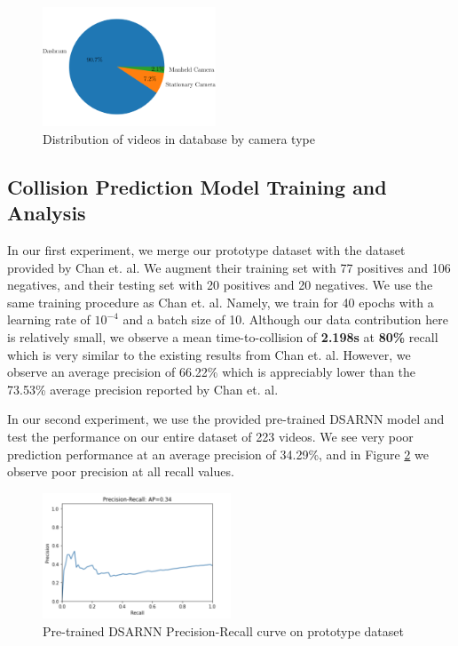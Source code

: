 \documentclass[letterpaper, 10 pt, conference]{ieeeconf}
\begin{document}
\begin{figure}[!h]
	\centering
	\includegraphics[width=0.46\textwidth,trim={0 1cm 0 1cm},clip]{by-camera.png}
	\caption{Distribution of videos in database by camera type}
	\label{fig:vids-by-camera}
\end{figure}

\subsection{Collision Prediction Model Training and Analysis}
\label{section-collision-prediction}
In our first experiment, we merge our prototype dataset with the dataset provided by Chan et. al. We augment their training set with 77 positives and 106 negatives, and their testing set with 20 positives and 20 negatives. We use the same training procedure as Chan et. al. Namely, we train for 40 epochs with a learning rate of $10^{-4}$ and a batch size of 10. Although our data contribution here is relatively small, we observe a mean time-to-collision of \textbf{2.198s} at \textbf{80\%} recall which is very similar to the existing results from Chan et. al. However, we observe an average precision of 66.22\% which is appreciably lower than the 73.53\% average precision reported by Chan et. al. \cite{chan2016anticipating}

In our second experiment, we use the provided pre-trained DSARNN model and test the performance on our entire dataset of 223 videos. We see very poor prediction performance at an average precision of 34.29\%, and in Figure \ref{fig:pr_curve} we observe poor precision at all recall values.

\begin{figure}[!htbp]
		\centering
		\includegraphics[width=0.5\textwidth]{prcurve.png}
		\caption{Pre-trained DSARNN Precision-Recall curve on prototype dataset}
		\label{fig:pr_curve}
\end{figure}
\end{document}
